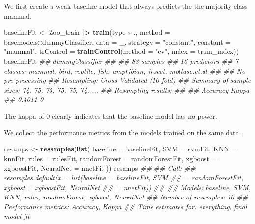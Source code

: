 \documentclass[
  notitlepage]{book}
\newenvironment{Shaded}{\begin{snugshade}}{\end{snugshade}}
\newcommand{\CommentTok}[1]{\textcolor[rgb]{0.56,0.35,0.01}{\textit{#1}}}
\newcommand{\DataTypeTok}[1]{\textcolor[rgb]{0.13,0.29,0.53}{#1}}
\newcommand{\ErrorTok}[1]{\textcolor[rgb]{0.64,0.00,0.00}{\textbf{#1}}}
\newcommand{\KeywordTok}[1]{\textcolor[rgb]{0.13,0.29,0.53}{\textbf{#1}}}
\newcommand{\NormalTok}[1]{#1}
\newcommand{\OperatorTok}[1]{\textcolor[rgb]{0.81,0.36,0.00}{\textbf{#1}}}
\newcommand{\StringTok}[1]{\textcolor[rgb]{0.31,0.60,0.02}{#1}}
\begin{document}
We first create a weak baseline model that always predicts the the majority
class mammal.

\begin{Shaded}
\begin{Highlighting}[]
\NormalTok{baselineFit \textless{}{-}}\StringTok{ }\NormalTok{Zoo\_train }\OperatorTok{|}\ErrorTok{\textgreater{}}\StringTok{ }\KeywordTok{train}\NormalTok{(type }\OperatorTok{\textasciitilde{}}\StringTok{ }\NormalTok{.,}
  \DataTypeTok{method =}\NormalTok{ basemodels}\OperatorTok{::}\NormalTok{dummyClassifier,}
  \DataTypeTok{data =}\NormalTok{ \_,}
  \DataTypeTok{strategy =} \StringTok{"constant"}\NormalTok{,}
  \DataTypeTok{constant =} \StringTok{"mammal"}\NormalTok{,}
  \DataTypeTok{trControl =} \KeywordTok{trainControl}\NormalTok{(}\DataTypeTok{method =} \StringTok{"cv"}\NormalTok{, }
                           \DataTypeTok{index =}\NormalTok{ train\_index))}
\NormalTok{baselineFit}
\CommentTok{\#\# dummyClassifier }
\CommentTok{\#\# }
\CommentTok{\#\# 83 samples}
\CommentTok{\#\# 16 predictors}
\CommentTok{\#\#  7 classes: \textquotesingle{}mammal\textquotesingle{}, \textquotesingle{}bird\textquotesingle{}, \textquotesingle{}reptile\textquotesingle{}, \textquotesingle{}fish\textquotesingle{}, \textquotesingle{}amphibian\textquotesingle{}, \textquotesingle{}insect\textquotesingle{}, \textquotesingle{}mollusc.et.al\textquotesingle{} }
\CommentTok{\#\# }
\CommentTok{\#\# No pre{-}processing}
\CommentTok{\#\# Resampling: Cross{-}Validated (10 fold) }
\CommentTok{\#\# Summary of sample sizes: 74, 75, 75, 75, 75, 74, ... }
\CommentTok{\#\# Resampling results:}
\CommentTok{\#\# }
\CommentTok{\#\#   Accuracy  Kappa}
\CommentTok{\#\#   0.4011    0}
\end{Highlighting}
\end{Shaded}

The kappa of 0 clearly indicates that the baseline model has no power.

We collect the performance metrics from the models trained on the same
data.

\begin{Shaded}
\begin{Highlighting}[]
\NormalTok{resamps \textless{}{-}}\StringTok{ }\KeywordTok{resamples}\NormalTok{(}\KeywordTok{list}\NormalTok{(}
  \DataTypeTok{baseline =}\NormalTok{ baselineFit,}
  \DataTypeTok{SVM =}\NormalTok{ svmFit,}
  \DataTypeTok{KNN =}\NormalTok{ knnFit,}
  \DataTypeTok{rules =}\NormalTok{ rulesFit,}
  \DataTypeTok{randomForest =}\NormalTok{ randomForestFit,}
  \DataTypeTok{xgboost =}\NormalTok{ xgboostFit,}
  \DataTypeTok{NeuralNet =}\NormalTok{ nnetFit}
\NormalTok{    ))}
\NormalTok{resamps}
\CommentTok{\#\# }
\CommentTok{\#\# Call:}
\CommentTok{\#\# resamples.default(x = list(baseline = baselineFit, SVM}
\CommentTok{\#\#  = randomForestFit, xgboost = xgboostFit, NeuralNet}
\CommentTok{\#\#  = nnetFit))}
\CommentTok{\#\# }
\CommentTok{\#\# Models: baseline, SVM, KNN, rules, randomForest, xgboost, NeuralNet }
\CommentTok{\#\# Number of resamples: 10 }
\CommentTok{\#\# Performance metrics: Accuracy, Kappa }
\CommentTok{\#\# Time estimates for: everything, final model fit}
\end{Highlighting}
\end{Shaded}
\end{document}
